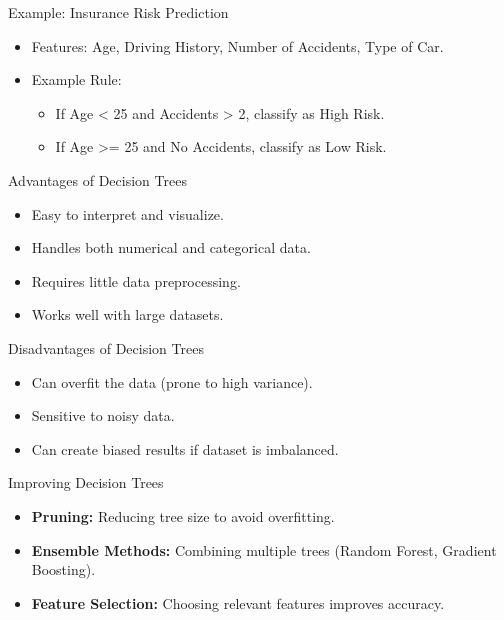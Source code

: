 \documentclass[serif, aspectratio=169]{beamer}
\begin{document}
\begin{frame}{Example: Insurance Risk Prediction}
    \begin{itemize}
        \item Features: Age, Driving History, Number of Accidents, Type of Car.
        \item Example Rule:
        \begin{itemize}
            \item If Age < 25 and Accidents > 2, classify as High Risk.
            \item If Age >= 25 and No Accidents, classify as Low Risk.
        \end{itemize}
    \end{itemize}
\end{frame}

\begin{frame}{Advantages of Decision Trees}
    \begin{itemize}
        \item Easy to interpret and visualize.
        \item Handles both numerical and categorical data.
        \item Requires little data preprocessing.
        \item Works well with large datasets.
    \end{itemize}
\end{frame}

\begin{frame}{Disadvantages of Decision Trees}
    \begin{itemize}
        \item Can overfit the data (prone to high variance).
        \item Sensitive to noisy data.
        \item Can create biased results if dataset is imbalanced.
    \end{itemize}
\end{frame}

\begin{frame}{Improving Decision Trees}
    \begin{itemize}
        \item \textbf{Pruning:} Reducing tree size to avoid overfitting.
        \item \textbf{Ensemble Methods:} Combining multiple trees (Random Forest, Gradient Boosting).
        \item \textbf{Feature Selection:} Choosing relevant features improves accuracy.
    \end{itemize}
\end{frame}
\end{document}
